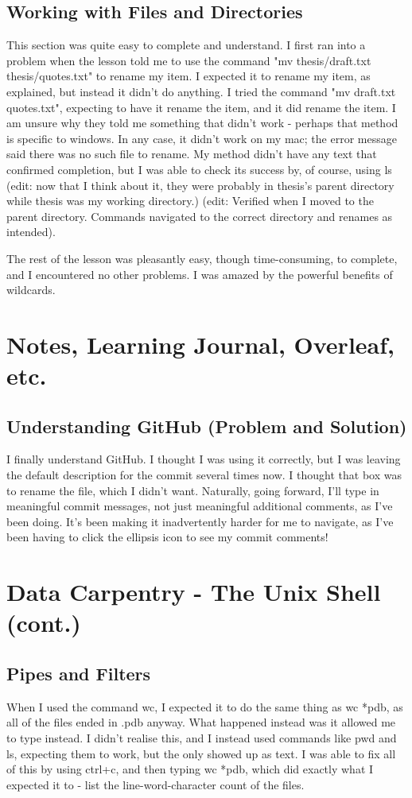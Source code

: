 \documentclass{article}
\begin{document}
\subsection{Working with Files and Directories}
This section was quite easy to complete and understand. I first ran into a problem when the lesson told me to use the command "mv thesis/draft.txt thesis/quotes.txt" to rename my item. I expected it to rename my item, as explained, but instead it didn't do anything. I tried the command "mv draft.txt quotes.txt", expecting to have it rename the item, and it did rename the item. I am unsure why they told me something that didn't work - perhaps that method is specific to windows. In any case, it didn't work on my mac; the error message said there was no such file to rename. My method didn't have any text that confirmed completion, but I was able to check its success by, of course, using ls (edit: now that I think about it, they were probably in thesis's parent directory while thesis was my working directory.) (edit: Verified when I moved to the parent directory. Commands navigated to the correct directory and renames as intended).

The rest of the lesson was pleasantly easy, though time-consuming, to complete, and I encountered no other problems. I was amazed by the powerful benefits of wildcards.

\section{Notes, Learning Journal, Overleaf, etc.}
\subsection{Understanding GitHub (Problem and Solution)}
I finally understand GitHub. I thought I was using it correctly, but I was leaving the default description for the commit several times now. I thought that box was to rename the file, which I didn't want. Naturally, going forward, I'll type in meaningful commit messages, not just meaningful additional comments, as I've been doing. It's been making it inadvertently harder for me to navigate, as I've been having to click the ellipsis icon to see my commit comments!

\date{29th August - 6th September 2019}
\section{Data Carpentry - The Unix Shell (cont.)}
\subsection{Pipes and Filters}
When I used the command wc, I expected it to do the same thing as wc *pdb, as all of the files ended in .pdb anyway. What happened instead was it allowed me to type instead. I didn't realise this, and I instead used commands like pwd and ls, expecting them to work, but the only showed up as text. I was able to fix all of this by using ctrl+c, and then typing wc *pdb, which did exactly what I expected it to - list the line-word-character count of the files.
\end{document}

